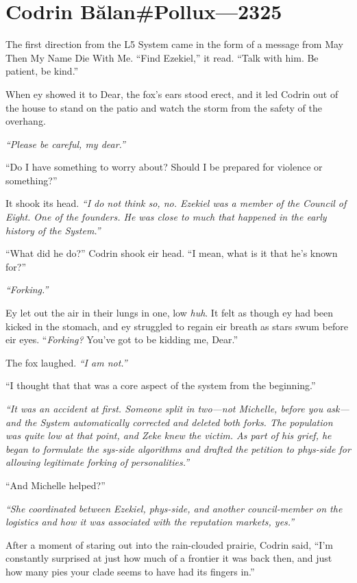 \hypertarget{codrin-bux103lanpollux-2325}{%
\chapter{Codrin Bălan\#Pollux—2325}\label{codrin-bux103lanpollux-2325}}

The first direction from the L5 System came in the form of a message from May Then My Name Die With Me. ``Find Ezekiel,'' it read. ``Talk with him. Be patient, be kind.''

When ey showed it to Dear, the fox's ears stood erect, and it led Codrin out of the house to stand on the patio and watch the storm from the safety of the overhang.

\emph{``Please be careful, my dear.''}

``Do I have something to worry about? Should I be prepared for violence or something?''

It shook its head. \emph{``I do not think so, no. Ezekiel was a member of the Council of Eight. One of the founders. He was close to much that happened in the early history of the System.''}

``What did he do?'' Codrin shook eir head. ``I mean, what is it that he's known for?''

\emph{``Forking.''}

Ey let out the air in their lungs in one, low \emph{huh}. It felt as though ey had been kicked in the stomach, and ey struggled to regain eir breath as stars swum before eir eyes. ``\emph{Forking?} You've got to be kidding me, Dear.''

The fox laughed. \emph{``I am not.''}

``I thought that that was a core aspect of the system from the beginning.''

\emph{``It was an accident at first. Someone split in two---not Michelle, before you ask---and the System automatically corrected and deleted both forks. The population was quite low at that point, and Zeke knew the victim. As part of his grief, he began to formulate the sys-side algorithms and drafted the petition to phys-side for allowing legitimate forking of personalities.''}

``And Michelle helped?''

\emph{``She coordinated between Ezekiel, phys-side, and another council-member on the logistics and how it was associated with the reputation markets, yes.''}

After a moment of staring out into the rain-clouded prairie, Codrin said, ``I'm constantly surprised at just how much of a frontier it was back then, and just how many pies your clade seems to have had its fingers in.''

